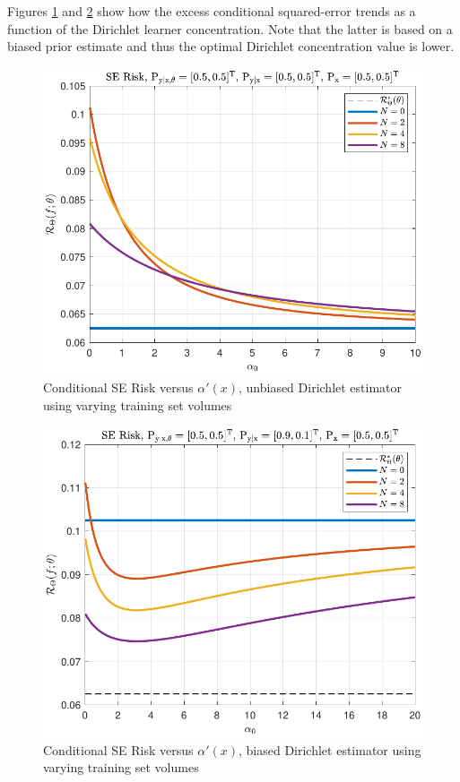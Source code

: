 \documentclass[12pt]{report}
\begin{document}
Figures \ref{fig:Risk_cond_SE_Dir_a0_leg_N_unbiased} and \ref{fig:Risk_cond_SE_Dir_a0_leg_N_biased} show how the excess conditional squared-error trends as a function of the Dirichlet learner concentration. Note that the latter is based on a biased prior estimate and thus the optimal Dirichlet concentration value is lower.
\begin{figure}
\centering
\includegraphics[width=0.7\linewidth]{Risk_cond_SE_Dir_a0_leg_N_unbiased.pdf}
\caption{Conditional SE Risk versus $\alpha'(x)$, unbiased Dirichlet estimator using varying training set volumes}
\label{fig:Risk_cond_SE_Dir_a0_leg_N_unbiased}
\end{figure}
\begin{figure}
\centering
\includegraphics[width=0.7\linewidth]{Risk_cond_SE_Dir_a0_leg_N_biased.pdf}
\caption{Conditional SE Risk versus $\alpha'(x)$, biased Dirichlet estimator using varying training set volumes}
\label{fig:Risk_cond_SE_Dir_a0_leg_N_biased}
\end{figure}
\end{document}
